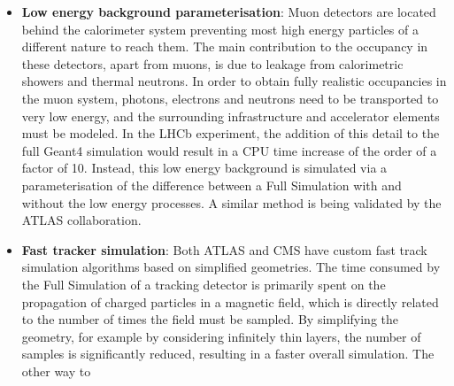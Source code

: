 \documentclass[12pt,a4paper]{article}
\begin{document}
{\begin{itemize}
  can be achieved by a simple parameterisation. Although not part of the
  current default simulation, CMS implemented shower parameterisations
  using GFLASH to model the shower after the first interaction
  of each primary particle with matter, by tuning a set of parameters to
  fit the geometric distribution of the associated energy depositions
  obtained from a Geant4 simulation. The ATLAS approach uses histograms
  with energy deposit and shower shape information to directly treat
  particles before they enter the cryostat. All these approaches have
  the advantage that they can ignore, during energy deposition, the
  detailed geometry of the calorimeter, and deal only with the readout
  geometry. All have the option of building objects similar to the
  energy depositions from Geant4 or attempting to directly build
  summary-like objects that are used in digitisation. Typically,
  parametric simulation achieves speedup factors of 100-1000 in the part
  of the detector treated by the parameterisation.
\item
  \textbf{Low energy background parameterisation}: Muon detectors are
  located behind the calorimeter system preventing most high energy
  particles of a different nature to reach them. The main contribution
  to the occupancy in these detectors, apart from muons, is due to
  leakage from calorimetric showers and thermal neutrons. In order to
  obtain fully realistic occupancies in the muon system, photons,
  electrons and neutrons need to be transported to very low energy, and
  the surrounding infrastructure and accelerator elements must be
  modeled. In the LHCb experiment, the addition of this detail to the
  full Geant4 simulation would result in a CPU time increase of the
  order of a factor of 10. Instead, this low energy background is
  simulated via a parameterisation of the difference between a Full
  Simulation with and without the low energy processes. A similar method
  is being validated by the ATLAS collaboration.
\item
  \textbf{Fast tracker simulation}: Both ATLAS and CMS have custom fast
  track simulation algorithms based on simplified geometries. The time
  consumed by the Full Simulation of a tracking detector is primarily
  spent on the propagation of charged particles in a magnetic field,
  which is directly related to the number of times the field must be
  sampled. By simplifying the geometry, for example by considering
  infinitely thin layers, the number of samples is significantly
  reduced, resulting in a faster overall simulation. The other way to

\end{itemize}}
\end{document}
